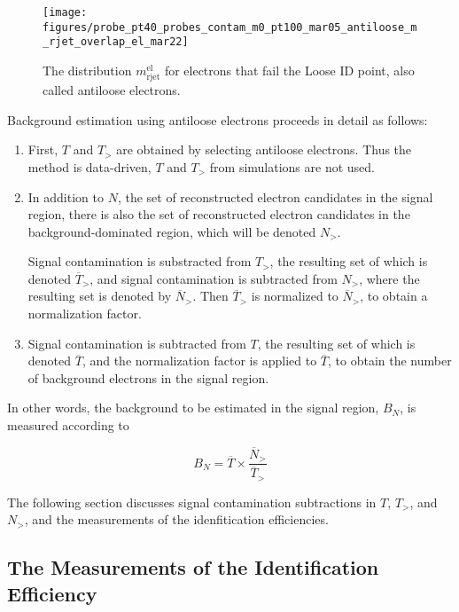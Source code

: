 \begin{figure}[H]
	\texttt{[image: figures/probe\_pt40\_probes\_contam\_m0\_pt100\_mar05\_antiloose\_m\_rjet\_overlap\_el\_mar22]}
	\centering
	\caption{The distribution $m_{\text{rjet}}^{\text{el}}$ for electrons that fail
		the Loose ID point, also called antiloose electrons.}
	\label{f:antiloosemrjet}
\end{figure}

Background estimation using antiloose electrons proceeds in detail as follows:

\begin{enumerate}

	\item First, $T$ and $T_>$ are obtained by selecting antiloose electrons. Thus the method
	      is data-driven, $T$ and $T_>$ from simulations are not used.

	\item In addition to $N$, the set of reconstructed electron candidates in the
	      signal region, there is also the set of reconstructed electron candidates in the
	      background-dominated region, which will be denoted $N_>$.

	      Signal contamination is substracted from $T_>$, the resulting set of which is
	      denoted $\overline{T}_>$, and signal contamination is subtracted from $N_>$, where
	      the resulting set is denoted by $\overline{N}_>$. Then $\overline{T}_>$ is normalized to
	      $\overline{N}_>$, to obtain a normalization factor.

	\item Signal contamination is subtracted from $T$, the resulting set of which is
	      denoted $\overline{T}$, and the normalization factor is applied to $\overline{T}$,
	      to obtain the number of background electrons in the signal region.

\end{enumerate}

In other words, the background to be estimated in the signal region, $B_N$, is
measured according to

\begin{equation}\label{eid:bne}
	B_N =  \overline{T} \times \frac{\overline{N}_>}{\overline{T}_>}
\end{equation}

The following section discusses signal contamination subtractions in $T$,
$T_>$, and $N_>$, and the measurements of the idenfitication efficiencies.

\subsection{The Measurements of the Identification Efficiency}\label{s:meffs}

